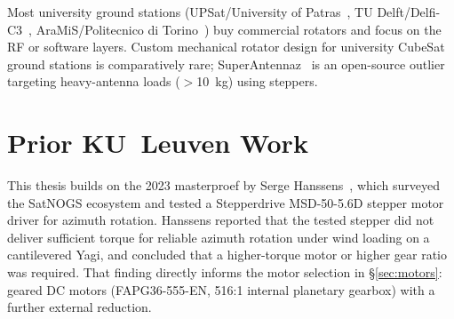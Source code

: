 Most university ground stations (UPSat/University of Patras~\cite{upsat}, TU Delft/Delfi-C3~\cite{tudelft-delfi}, AraMiS/Politecnico di Torino~\cite{masera2005aramis}) buy commercial rotators and focus on the RF or software layers. Custom mechanical rotator design for university CubeSat ground stations is comparatively rare; SuperAntennaz~\cite{superantennaz} is an open-source outlier targeting heavy-antenna loads ($>$10~kg) using steppers.

\section{Prior KU~Leuven Work}

This thesis builds on the 2023 masterproef by Serge Hanssens~\cite{hanssens2023}, which surveyed the SatNOGS ecosystem and tested a Stepperdrive MSD-50-5.6D stepper motor driver for azimuth rotation. Hanssens reported that the tested stepper did not deliver sufficient torque for reliable azimuth rotation under wind loading on a cantilevered Yagi, and concluded that a higher-torque motor or higher gear ratio was required. That finding directly informs the motor selection in \S\ref{sec:motors}: geared DC motors (FAPG36-555-EN, 516:1 internal planetary gearbox) with a further external reduction.
